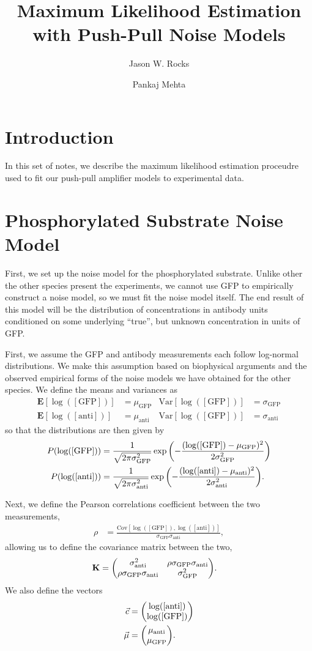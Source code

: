 \documentclass[aps,onecolumn,superscriptaddress,notitlepage]{revtex4-1}
\newcommand{\sigmaGFP}{\sigma_{\mathrm{GFP}}}
\newcommand{\sigmaanti}{\sigma_{\mathrm{anti}}}
\newcommand{\muGFP}{\mu_{\mathrm{GFP}}}
\newcommand{\muanti}{\mu_{\mathrm{anti}}}
\newcommand{\lGFP}{\log([\mathrm{GFP}])}
\newcommand{\lanti}{\log([\mathrm{anti}])}
\newcommand{\E}{\mathbf{E}}
\newcommand{\Var}{\mathrm{Var}}
\newcommand{\Cov}{\mathrm{Cov}}
\begin{document}
\title{Maximum Likelihood Estimation with Push-Pull Noise Models}
\author{Jason W. Rocks}
\author{Pankaj Mehta}
\maketitle

\section{Introduction}
In this set of notes, we describe the maximum likelihood estimation proceudre used to fit our push-pull amplifier models to experimental data.

\section{Phosphorylated Substrate Noise Model}

First, we set up the noise model for the phosphorylated substrate.
Unlike other the other species present the experiments,
we cannot use GFP to empirically construct a noise model,
so we must fit the noise model itself.
The end result of this model will be the distribution of concentrations in antibody units conditioned on some underlying ``true'', but unknown concentration in units of GFP.

First, we assume the GFP and antibody measurements each follow log-normal distributions. 
We make this assumption based on biophysical arguments and the observed empirical forms of the noise models we have obtained for the other species.  
We define the means and variances as
\begin{align}
\E[\lGFP] &= \muGFP & \Var[\lGFP] &= \sigmaGFP\\ 
\E[\lanti] &= \muanti & \Var[\lGFP]&= \sigmaanti
\end{align}
so that the distributions are then given by
\begin{align}
P(\lGFP) &= \frac{1}{\sqrt{2\pi\sigmaGFP^2 }}\exp\qty(-\frac{(\lGFP-\muGFP)^2}{2\sigmaGFP^2})\\
P(\lanti) &= \frac{1}{\sqrt{2\pi\sigmaanti^2 }}\exp\qty(-\frac{(\lanti-\muanti)^2}{2\sigmaanti^2}).
\end{align}

Next, we define the Pearson correlations coefficient between the two measurements,
\begin{align}
\rho &= \frac{\Cov[\lGFP, \lanti]}{\sigmaGFP\sigmaanti},
\end{align}
allowing us to define the covariance matrix between the two,
\begin{align}
\mathbf{K} &= \mqty(\sigmaanti^2 & \rho \sigmaGFP\sigmaanti\\
\rho \sigmaGFP\sigmaanti &  \sigmaGFP^2).
\end{align}
We also define the vectors
\begin{align}
\vec{c} &= \mqty(\lanti \\ \lGFP)\\
\vec{\mu} &= \mqty(\muanti \\\muGFP).
\end{align}
\end{document}

